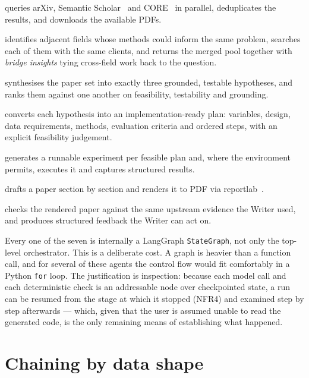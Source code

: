 \begin{description}[style=unboxed,leftmargin=0pt,itemsep=0.2em]
  \item[Literature] queries arXiv, Semantic Scholar~\cite{semanticscholar} and
    CORE~\cite{corapi} in parallel, deduplicates the results, and downloads the available PDFs.
  \item[Interdisciplinary Literature] identifies adjacent fields whose methods could inform
    the same problem, searches each of them with the same clients, and returns the merged pool
    together with \emph{bridge insights} tying cross-field work back to the question.
  \item[Hypothesis] synthesises the paper set into exactly three grounded, testable
    hypotheses, and ranks them against one another on feasibility, testability and grounding.
  \item[Experiment Planner] converts each hypothesis into an implementation-ready plan:
    variables, design, data requirements, methods, evaluation criteria and ordered steps,
    with an explicit feasibility judgement.
  \item[Coder] generates a runnable experiment per feasible plan and, where the environment
    permits, executes it and captures structured results.
  \item[Writer] drafts a paper section by section and renders it to
    PDF via reportlab~\cite{reportlab}.
  \item[Reviewer] checks the rendered paper against the same upstream evidence the Writer
    used, and produces structured feedback the Writer can act on.
\end{description}

Every one of the seven is internally a LangGraph \texttt{StateGraph}, not only the top-level
orchestrator. This is a deliberate cost. A graph is heavier than a function call, and for
several of these agents the control flow would fit comfortably in a Python \texttt{for} loop.
The justification is inspection: because each model call and each deterministic check is an
addressable node over checkpointed state, a run can be resumed from the stage at which it
stopped (NFR4) and examined step by step afterwards --- which, given that the user is assumed
unable to read the generated code, is the only remaining means of establishing what happened.

\section{Chaining by data shape}
\label{sec:chaining}

